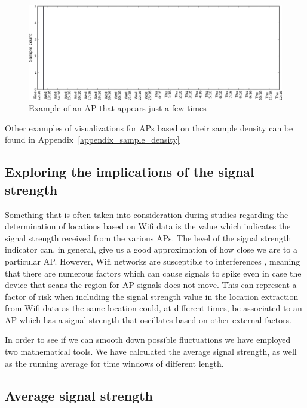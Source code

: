 \begin{figure}[h]
\centering
\includegraphics[width
=\textwidth, height =
0.4\textwidth]{figures/combinations/1553_modif.png}
\caption{Example of an AP that appears just a few times}
\label{few_samples_6_2nd_day}
\end{figure}

Other examples of visualizations for APs based on their sample density can be
found in Appendix~\ref{appendix_sample_density}

\subsection{Exploring the implications of the signal strength}

Something that is often taken into consideration during studies regarding the
determination of locations based on Wifi data is the value which indicates the
signal strength received from the various APs. The level of the signal strength
indicator can, in general, give us a good approximation of how close we are to a
particular AP. However, Wifi networks are susceptible to interferences
\cite{MahantiCWA10}, meaning that there are numerous factors which can cause
signals to spike even in case the device that scans the region for AP signals
does not move. This can represent a factor of risk when including the signal
strength value in the location extraction from Wifi data as the same location
could, at different times, be associated to an AP which has a signal strength
that oscillates based on other external factors.

In order to see if we can smooth down possible fluctuations we have employed two
mathematical tools. We have calculated the average signal strength, as well as
the running average for time windows of different length.

\subsection{Average signal strength}
\label{average_sig}

